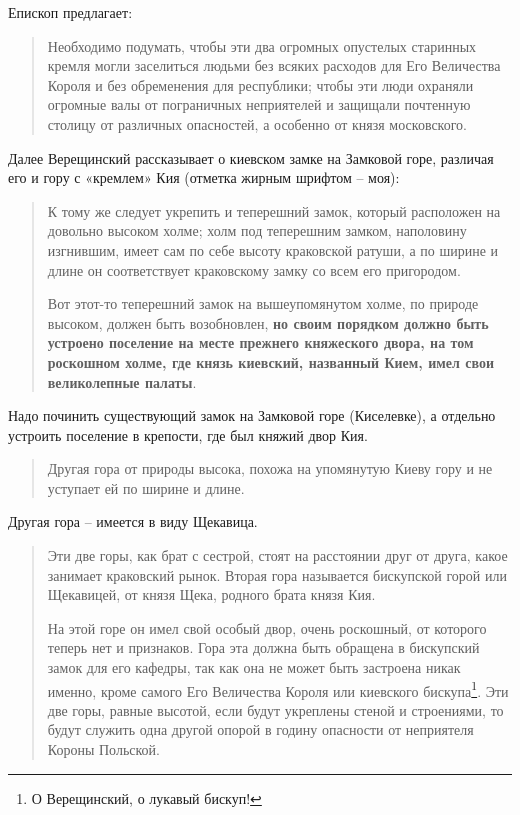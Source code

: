 Епископ предлагает:

\begin{quotation}
Необходимо подумать, чтобы эти два огромных опустелых старинных кремля могли заселиться людьми без всяких расходов для Его Величества Короля и без обременения для республики; чтобы эти люди охраняли огромные валы от пограничных неприятелей и защищали почтенную столицу от различных опасностей, а особенно от князя московского.
\end{quotation}

Далее Верещинский рассказывает о киевском замке на Замковой горе, различая его и гору с «кремлем» Кия (отметка жирным шрифтом – моя):

\begin{quotation}
К тому же следует укрепить и теперешний замок, который расположен на довольно высоком холме; холм под теперешним замком, наполовину изгнившим, имеет сам по себе высоту краковской ратуши, а по ширине и длине он соответствует краковскому замку со всем его пригородом.

Вот этот-то теперешний замок на вышеупомянутом холме, по природе высоком, должен быть возобновлен, \textbf{но своим порядком должно быть устроено поселение на месте пре\-жнего княжеского двора, на том роскошном холме, где князь киевский, названный Кием, имел свои великолепные палаты}.
\end{quotation}

Надо починить существующий замок на Замковой горе (Киселевке), а отдельно устроить поселение в крепости, где был княжий двор Кия.

\begin{quotation}
Другая гора от природы высока, похожа на упомянутую Киеву гору и не уступает ей по ширине и длине. 
\end{quotation}

Другая гора – имеется в виду Щекавица.

\begin{quotation}
Эти две горы, как брат с сестрой, стоят на расстоянии друг от друга, какое занимает краковский рынок. Вторая гора называется бискупской горой или Щекавицей, от князя Щека, родного брата князя Кия.

На этой горе он имел свой особый двор, очень роскошный, от которого теперь нет и признаков. Гора эта должна быть обращена в бискупский замок для его кафедры, так как она не может быть застроена никак именно, кроме самого Его Величества Короля или киевского бискупа\footnote{О Верещинский, о лукавый бискуп!}. Эти две горы, равные высотой, если будут укреплены стеной и строениями, то будут служить одна другой опорой в годину опасности от неприятеля Короны Польской.
\end{quotation}

